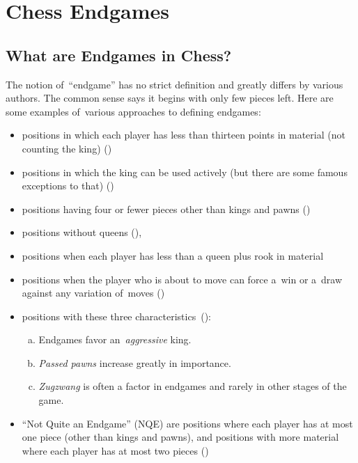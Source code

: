 \chapter{Chess Endgames}
\label{ch:Chess}

\section{What are Endgames in Chess?}
The notion of~``endgame'' has no strict definition and greatly differs by various authors.
The common sense says it begins with only few pieces left.
Here are some examples of~various approaches to defining endgames:
\begin{itemize}
  \item
    positions in which each player has less than thirteen points in material (not counting the king)
    (\cite[pp.~7--8]{Speelman1981endgame})
    
  \item
    positions in which the king can be used actively (but there are some famous exceptions to that)
    (\cite[pp.~7--8]{Speelman1981endgame})
    
  \item
    positions having four or fewer pieces other than kings and pawns
    (\cite[p.~5]{Minev2004practical})
    
  \item
    positions without queens
    (\cite{Fine1952middle}),
    
  \item
    positions when each player has less than a queen plus rook in material
    
  \item
    positions when the player who is about to move can force a~win or a~draw against any variation of~moves
    (\cite{Portisch1981six})

  \item 
    positions with these three characteristics~(\cite{Alburt1999just}):

    \begin{enumerate}[(a)]
      \item Endgames favor an~\emph{aggressive} king.
      \item \emph{Passed pawns} increase greatly in importance.
      \item \emph{Zugzwang} is often a factor in endgames and rarely in other stages of the game.
    \end{enumerate}

  \item
    ``Not Quite an Endgame'' (NQE) are positions where each player has at most one piece (other than kings and pawns), and positions with more material where each player has at most two pieces
    (\cite[pp.~7--8]{Flear2007practical})
\end{itemize}

